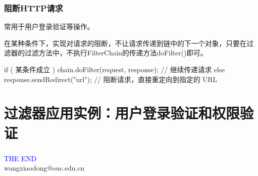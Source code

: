 \begin{frame}[fragile] %
\frametitle{阻断HTTP请求} 

常用于用户登录验证等操作。

在某种条件下，实现对请求的阻断，不让请求传递到链中的下一个对象，只要在过滤器的过滤方法中，不执行FilterChain的传递方法doFilter()即可。

\begin{javaCode}
if ( 某条件成立 ) {
  chain.doFilter(request, response); // 继续传递请求
} else {
  response.sendRedirect("url"); // 阻断请求，直接重定向到指定的 URL
}
\end{javaCode}
\end{frame}

\section{过滤器应用实例：用户登录验证和权限验证}

\begin{frame}[fragile] %
\frametitle{} 

\end{frame}
\begin{frame}
\centering
{\Huge \textcolor{blue}{THE END}} \\
\vspace{5mm}
{\Large wangxiaodong@ouc.edu.cn} \\
\end{frame}

